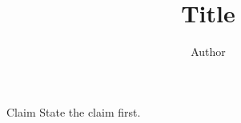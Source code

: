 \documentclass{beamer}
\title{Title}
\author{Author}
\date{}
\begin{document}
\begin{frame}\titlepage\end{frame}
\begin{frame}{Claim}
State the claim first.
\end{frame}
\end{document}

